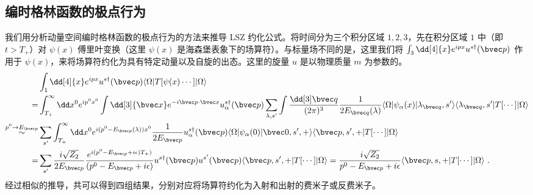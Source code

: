 
\subsection{编时格林函数的极点行为}
我们用分析动量空间编时格林函数的极点行为的方法来推导 LSZ 约化公式。将时间分为三个积分区域 $1,2,3$，先在积分区域 $1$ 中（即 $t>T_+$）对 $\psi(x)$ 傅里叶变换（这里 $\psi(x)$ 是海森堡表象下的场算符）。与标量场不同的是，这里我们将 $\int_{3} \dd[4]{x} e^{ipx} u^{s\dagger}(\bvec p)$ 作用于 $\psi(x)$，来将场算符约化为具有特定动量以及自旋的出态。这里的旋量 $u$ 是以物理质量 $m$ 为参数的。
\begin{equation}
\begin{aligned}
&\int_{1} \dd[4]{x} e^{ipx} u^{s\dagger}(\bvec p)\langle \Omega|T[\psi(x)\cdots]|\Omega\rangle\\
=&\int_{T_+}^\infty \dd x^0 e^{ip^0x^0}\int \dd[3]{\bvec x} e^{-i\bvec p\cdot \bvec x} u^{s\dagger}_\alpha(\bvec p)
\sum_{\lambda, s'}\int \frac{\dd[3] \bvec q}{(2\pi)^3} \frac{1}{2E_{\bvec q}(\lambda)}\langle \Omega|\psi_\alpha(x)|\lambda_{\bvec q},s'\rangle \langle \lambda_{\bvec q},s'| T[\cdots]|\Omega\rangle\\
\stackrel{p^0\rightarrow E_{\bvec p}}{\sim}
&
\sum_{s'}\int_{T_+}^\infty \dd x^0 e^{i(p^0-E_{\bvec p}(\lambda))x^0}
\frac{1}{2E_{\bvec p}} u^{s\dagger}_\alpha(\bvec p)\langle \Omega|\psi_\alpha(0)|\bvec 0,s',+\rangle\langle \bvec p,s',+| T[\cdots]|\Omega\rangle\\
=&\sum_{s'}\frac{i\sqrt{Z_2}}{2E_{\bvec p}}\frac{e^{i(p^0-E_{\bvec p}+i\epsilon)T_+)}}{(p^0-E_{\bvec p}+i\epsilon)} u^{s\dagger}(\bvec p)u^{s'}(\bvec p)\langle \bvec p,s',+| T[\cdots]|\Omega\rangle= \frac{i\sqrt{Z_2}}{p^0-E_{\bvec p}+i\epsilon} \langle \bvec p,s,+| T[\cdots]|\Omega\rangle~.
\end{aligned}
\end{equation}
经过相似的推导，共可以得到四组结果，分别对应将场算符约化为入射和出射的费米子或反费米子。
